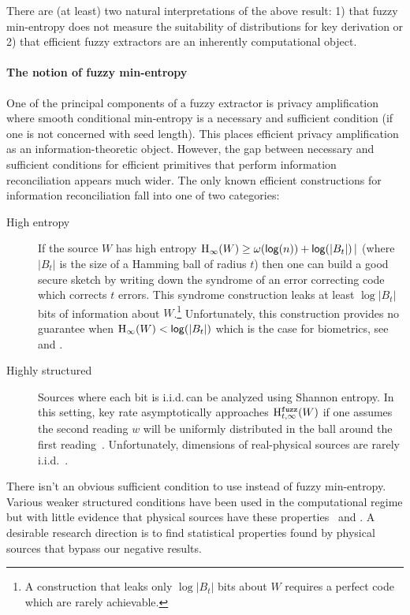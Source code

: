 There are (at least) two natural interpretations of the above result: 1) that fuzzy min-entropy does not measure the suitability of distributions for key derivation or 2) that efficient fuzzy extractors are an inherently computational object.

\paragraph{The notion of fuzzy min-entropy}
One of the principal components of a fuzzy extractor is privacy amplification where smooth conditional min-entropy is a necessary and sufficient condition (if one is not concerned with seed length).  This places efficient privacy amplification as an information-theoretic object.  However, the gap between necessary and sufficient conditions for efficient primitives that perform information reconciliation appears much wider. The only known efficient constructions for information reconciliation fall into one of two categories:
\begin{description}
\item[High entropy] If the source $W$ has high entropy $\mathrm{H}_\infty(W)\ge \omega(\mathsf{log}\!\left(n\right)) + \mathsf{log}\!\left(|B_t|\right)|$ (where $|B_t|$ is the size of a Hamming ball of radius $t$) then one can build a good secure sketch by writing down the syndrome of an error correcting code which corrects $t$ errors.  This syndrome construction  leaks at least $\log{|B_t|}$ bits of information about $W$.\footnote{A construction that leaks only $\log{|B_t|}$ bits about $W$ requires a perfect code which are rarely achievable.}  Unfortunately, this construction provides no guarantee when $\mathrm{H}_\infty(W)< \mathsf{log}\!\left(|B_t|\right)$ which is the case for biometrics, see \cite[Proposition 1]{canetti2021reusable} and \cite[Introduction]{simhadri2019cryptographic}.
\item[Highly structured] Sources where each bit is i.i.d.\,can be analyzed using Shannon entropy.  In this setting, key rate asymptotically approaches $\mathrm{H}^{\mathtt{fuzz}}_{t,\infty}(W)$ if one assumes the second reading $w$ will be uniformly distributed in the ball around the first reading~\cite[Theorem 2]{tuyls2004capacity}.  Unfortunately, dimensions of real-physical sources are rarely i.i.d.~\cite{daugman2004}.
\end{description}

There isn't an obvious sufficient condition to use instead of fuzzy min-entropy.  Various weaker structured conditions have been used in the computational regime but with little evidence that physical sources have these properties~\cite[Figure 1]{demarest2021code} and \cite{simhadri2019cryptographic}. A desirable research direction is to find statistical properties found by physical sources that bypass our negative results. 

